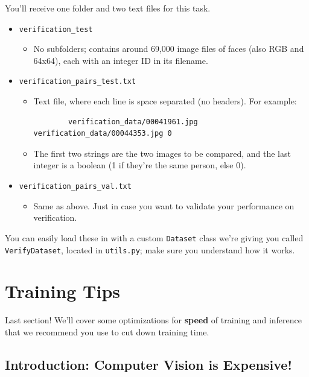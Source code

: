 \documentclass{article}
\newcommand{\ttt}[1]{\texttt{#1}}
\begin{document}
You'll receive one folder and two text files for this task.

\begin{itemize}
    \item \ttt{verification\_test}
        \begin{itemize}
            \item No subfolders; contains around 69,000 image files of faces (also RGB and 64x64), each with an integer ID in its filename.
        \end{itemize}
    \item \ttt{verification\_pairs\_test.txt}
        \begin{itemize}
            \item Text file, where each line is space separated (no headers). For example:
    \begin{verbatim}
        verification_data/00041961.jpg verification_data/00044353.jpg 0
    \end{verbatim}
        \item The first two strings are the two images to be compared, and the last integer is a boolean (1 if they're the same person, else 0).
        \end{itemize} 
    \item \ttt{verification\_pairs\_val.txt}
        \begin{itemize}
            \item Same as above. Just in case you want to validate your performance on verification.
        \end{itemize}
\end{itemize}


You can easily load these in with a custom \ttt{Dataset} class we're giving you called \ttt{VerifyDataset}, located in \ttt{utils.py}; make sure you understand how it works.

\newpage{}
\section{Training Tips}

Last section! We'll cover some optimizations for \textbf{speed} of training and inference that we recommend you use to cut down training time.

\subsection*{Introduction: Computer Vision is Expensive!}
\end{document}

